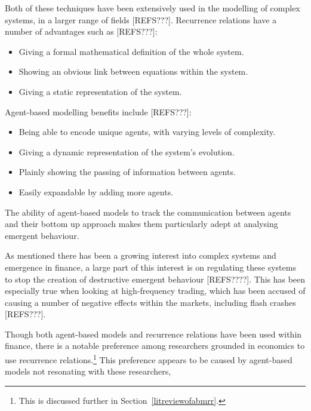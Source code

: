 \documentclass{article}
\begin{document}
Both of these techniques have been extensively used in the modelling of complex systems, in a larger range of fields [REFS???]. %
Recurrence relations have a number of advantages such as [REFS???]:
\begin{itemize}
  \item Giving a formal mathematical definition of the whole system.
  \item Showing an obvious link between equations within the system. 
  \item Giving a static representation of the system.  
\end{itemize}
Agent-based modelling benefits include [REFS???]:
\begin{itemize}
  \item Being able to encode unique agents, with varying levels of complexity.
  \item Giving a dynamic representation of the system's evolution. 
  \item Plainly showing the passing of information between agents.
  \item Easily expandable by adding more agents.  
\end{itemize}          
The ability of agent-based models to track the communication between agents and their bottom up approach makes them particularly adept at analysing emergent behaviour. 

As mentioned there has been a growing interest into complex systems and emergence in finance, a large part of this interest is on regulating these systems to stop the creation of destructive emergent behaviour [REFS????]. This has been especially true when looking at high-frequency trading, which has been accused of causing a number of negative effects within the markets, including flash crashes [REFS???]. 

Though both agent-based models and recurrence relations have been used within finance, there is a notable preference among researchers grounded in economics to use recurrence relations.\footnote{This is discussed further in Section~\ref{litreviewofabmrr}.} This preference appears to be caused by agent-based models not resonating with these researchers, 
\end{document}
